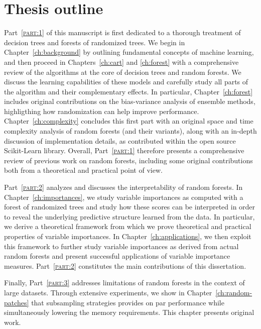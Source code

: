 \section{Thesis outline}

Part~\textsc{\ref{part:1}} of this manuscript is first dedicated to a thorough
treatment of decision trees and forests of randomized trees. We begin in
Chapter~\ref{ch:background} by outlining fundamental concepts of machine
learning, and then proceed in Chapters~\ref{ch:cart} and \ref{ch:forest} with a
comprehensive review of the algorithms at the core of decision trees and random
forests. We discuss the learning capabilities of these models and carefully
study all parts of the algorithm and their complementary effects. In particular,
Chapter~\ref{ch:forest} includes original contributions on the bias-variance
analysis of ensemble methods, highligthing how randomization can help improve
performance. Chapter~\ref{ch:complexity} concludes this first part with an
original space and time complexity analysis of random forests (and their
variants), along with an in-depth discussion of implementation details,
as contributed within the open source Scikit-Learn library.
Overall, Part~\textsc{\ref{part:1}} therefore presents a comprehensive review
of previous work on random forests, including some original contributions
both from a theoretical and practical point of view.

Part~\textsc{\ref{part:2}} analyzes and discusses the interpretability of
random forests. In Chapter~\ref{ch:importances}, we study variable importances
as computed with a forest of randomized trees and study how these scores can be
interpreted in order to reveal the underlying predictive structure learned from
the data. In particular, we derive a theoretical framework from which we prove
theoretical and practical properties of variable importances. In
Chapter~\ref{ch:applications}, we then exploit this framework to further study
variable importances as derived from actual random forests and present
successful applications of variable importance measures.
Part~\textsc{\ref{part:2}} constitutes the main contributions of this
dissertation.

Finally, Part~\textsc{\ref{part:3}} addresses limitations of random forests in
the context of large datasets. Through extensive experiments, we show in
Chapter~\ref{ch:random-patches} that subsampling strategies provides on par
performance while simultaneously lowering the memory requirements. This
chapter presents original work.

